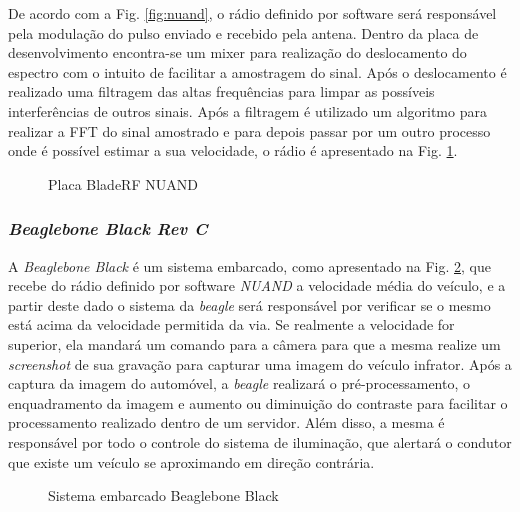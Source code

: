 De acordo com a Fig. \ref{fig:nuand}, o rádio definido por software será responsável pela modulação do pulso enviado e recebido pela antena. Dentro da placa de desenvolvimento encontra-se um mixer para realização do deslocamento do espectro com o intuito de facilitar a amostragem do sinal. Após o deslocamento é realizado uma filtragem das altas frequências para limpar as possíveis interferências de outros sinais. Após a filtragem é utilizado um algoritmo para realizar a FFT do sinal amostrado e para depois passar por um outro processo onde é possível estimar a sua velocidade, o rádio é apresentado na Fig. \ref{fig:bladerf}. 

\begin{figure}[!htb]
	\caption{\label{fig:bladerf} Placa BladeRF NUAND}
\end{figure}



\subsubsection{\emph{Beaglebone Black Rev C}} 

A \emph{Beaglebone Black} é um sistema embarcado, como apresentado na Fig. \ref{fig:beaglebone}, que recebe do rádio definido por software \emph{NUAND} a velocidade média do veículo, e a partir deste dado o sistema da \emph{beagle} será responsável por verificar se o mesmo está acima da velocidade permitida da via. Se realmente a velocidade for superior, ela mandará um comando para a câmera para que a mesma realize um \textit{screenshot} de sua gravação para capturar uma imagem do veículo infrator. Após a captura da imagem do automóvel, a \emph{beagle} realizará o pré-processamento, o enquadramento da imagem e aumento ou diminuição do contraste para facilitar o processamento realizado dentro de um servidor. Além disso, a mesma é responsável por todo o controle do sistema de iluminação, que alertará o condutor que existe um veículo se aproximando em direção contrária.

\begin{figure}[!htb]
	\caption{\label{fig:beaglebone} Sistema embarcado Beaglebone Black}
\end{figure}

